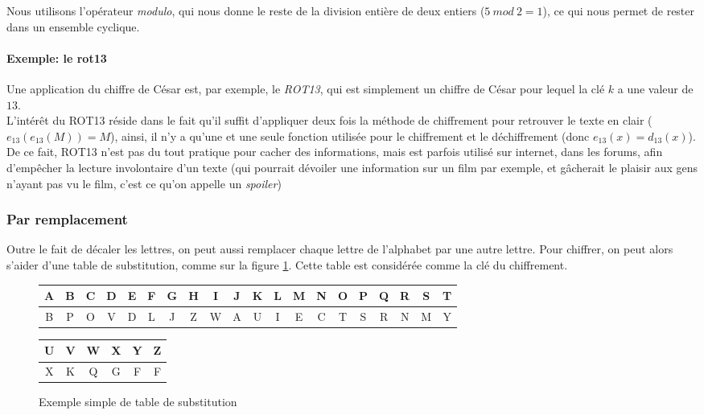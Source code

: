 Nous utilisons l'opérateur \emph{modulo}, qui nous donne le reste de
la division entière de deux entiers ($5~ mod~ 2 = 1$), ce qui nous
permet de rester dans un ensemble cyclique. \\

\paragraph{Exemple: le rot13\label{syst:rot13}}
Une application du chiffre de César est, par exemple, le \emph{ROT13},
qui est simplement un chiffre de César pour lequel la clé $k$ a une
valeur de $13$.\\

L'intérêt du ROT13 réside dans le fait qu'il suffit d'appliquer deux
fois la méthode de chiffrement pour retrouver le texte en clair
($e_{13}(e_{13}(M)) = M$), ainsi, il n'y a qu'une et une seule fonction utilisée
pour le chiffrement et le déchiffrement (donc $e_{13}(x) =
d_{13}(x)$). \\

De ce fait, ROT13 n'est pas du tout pratique pour cacher des
informations, mais est parfois utilisé sur internet, dans les forums,
afin d'empêcher la lecture involontaire d'un texte (qui pourrait
dévoiler une information sur un film par exemple, et gâcherait le
plaisir aux gens n'ayant pas vu le film, c'est ce qu'on appelle un 
\emph{spoiler}) 

\subsubsection{Par remplacement}
Outre le fait de décaler les lettres, on peut aussi remplacer chaque
lettre de l'alphabet par une autre lettre. Pour chiffrer, on peut alors
s'aider d'une table de substitution, comme sur la figure
\ref{fig:SubstitutionSimple}. Cette table est considérée comme la
clé du chiffrement.

 \begin{figure}[h]
   \begin{center}
    \begin{tabular}{|c|c|c|c|c|c|c|c|c|c|c|c|c|c|c|c|c|c|c|c}
      \hline
      A & B & C & D & E & F & G & H & I & J & K & L & M & N & O & P &
      Q & R & S & T \\
      \hline
      B & P & O & V & D & L & J & Z & W & A & U & I & E & C & T & S &
      R & N & M & Y \\
      \hline
    \end{tabular}
  \end{center}
  \begin{flushright}
    \begin{tabular}{c|c|c|c|c|c|}
      \hline
      U & V & W & X & Y & Z \\
      \hline
      X & K & Q & G & F & F \\
      \hline
    \end{tabular}
  \end{flushright}
  \caption{Exemple simple de table de substitution}
  \label{fig:SubstitutionSimple}
\end{figure}

